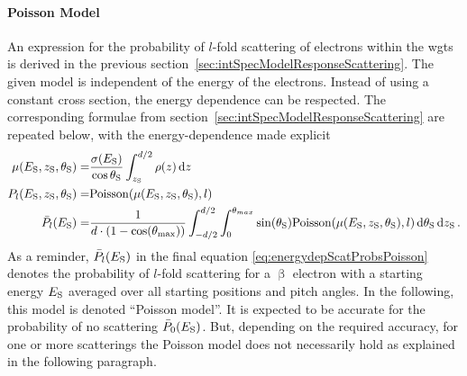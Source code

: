 \paragraph{Poisson Model}
An expression for the probability of $l$-fold scattering of electrons within the \gls{wgts} is derived in the previous section~\ref{sec:intSpecModelResponseScattering}. The given model is independent of the energy of the electrons. Instead of using a constant cross section, the energy dependence can be respected. The corresponding formulae from section~\ref{sec:intSpecModelResponseScattering} are repeated below, with the energy-dependence made explicit
\begin{subequations}
\label{eq:eDepScatCrossSecModelPoisson}
\begin{align}
    \mu(E_\mathrm{S},z_\mathrm{S},\theta_\mathrm{S}) =&
    \frac{\sigma(E_\mathrm{S})}{\cos\theta_\mathrm{S}}
    \int_{z_\mathrm{S}}^{d/2} \rho(z)\mathop{}\!\mathrm{d} z \label{eq:energydepScatProbsPoissonExpectedScatCount} \\
    P_l(E_\mathrm{S},z_\mathrm{S},\theta_\mathrm{S}) =&
    \mathrm{Poisson}(\mu(E_\mathrm{S},z_\mathrm{S},\theta_\mathrm{S}),l) \label{eq:eDepScatCrossSecModelPoissonNonAveragedScatProbs} \\
    \bar{P}_l(E_\mathrm{S}) =&
    \frac{1}{d \cdot (1-\cos(\theta_\mathrm{max}))} 
      \int_{-d/2}^{d/2}  
          \int_{0}^{\theta_{max}} 
            \sin(\theta_\mathrm{S})
            \mathrm{Poisson}(\mu(E_\mathrm{S},z_\mathrm{S},\theta_\mathrm{S}),l)
          \mathop{}\!\mathrm{d}\theta_\mathrm{S}
      \mathop{}\!\mathrm{d}z_\mathrm{S}
      \label{eq:eDepScatCrossSecModelPoissonAveragedScatProbs}
    \text{\,.}
\end{align}
\end{subequations}
As a reminder, $\bar{P}_l(E_\mathrm{S})$ in the final equation \eqref{eq:energydepScatProbsPoisson} denotes the probability of $l$-fold scattering for a $\upbeta$ electron with a starting energy $E_\mathrm{S}$ averaged over all starting positions and pitch angles. In the following, this model is denoted ``Poisson model''. It is expected to be accurate for the probability of no scattering $\bar{P}_0(E_\mathrm{S})$. But, depending on the required accuracy, for one or more scatterings the Poisson model does not necessarily hold as explained in the following paragraph.

